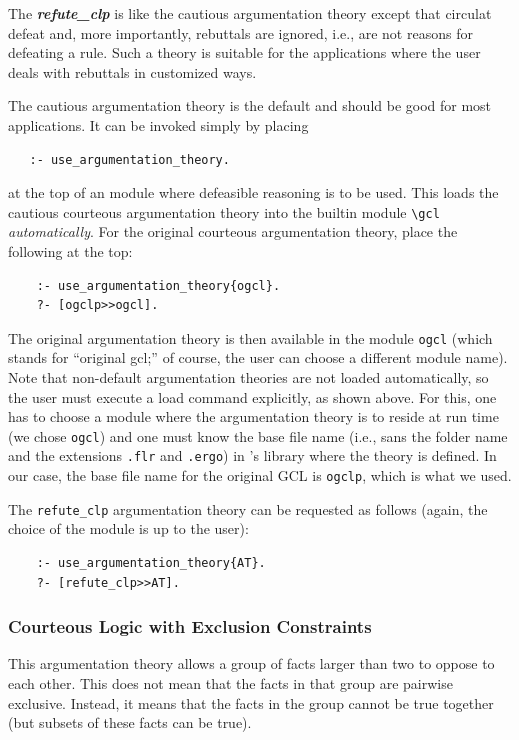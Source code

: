 \documentclass[11pt]{article}
\newcommand{\ERGO}{\mbox{\smaller{\ensuremath{\cal{E}}\smaller{{\sc{RGO}}}}}\xspace}
\newcommand{\FLSYSTEM}{\ERGO}
\newcommand{\bs}{\textbackslash}
\begin{document}
The \textbf{\emph{refute\_clp}}  is like the cautious argumentation
theory except that circulat defeat and, more importantly,
rebuttals are ignored, i.e., are not reasons for defeating a rule.
Such a theory is suitable for the applications where the user deals with
rebuttals in customized ways.

The cautious argumentation theory is the default and should be good for most
  applications. It can be invoked simply by placing
\begin{verbatim}
   :- use_argumentation_theory.
\end{verbatim}
  at the top of an \FLSYSTEM module where defeasible reasoning is to be
  used.  This loads the cautious courteous argumentation theory into the builtin
  module {\tt \bs{}gcl} \emph{automatically}. For the original courteous argumentation theory,
  place the following at the top:
\begin{verbatim}
    :- use_argumentation_theory{ogcl}.
    ?- [ogclp>>ogcl].
\end{verbatim}
The original argumentation theory is then available in the module {\tt ogcl}
(which stands for ``original gcl;'' of course, the user can choose a different module name).
Note that non-default argumentation theories are not loaded
automatically, so the user must execute a load command explicitly, as shown
above. For this, one has to choose a module where the
argumentation theory is to reside at run time
(we chose \texttt{ogcl}) and one must know the base file
name (i.e., sans the folder name and the extensions \texttt{.flr} and
\texttt{.ergo}) in \FLSYSTEM's library where the theory is defined. In our case, the base file name
for the original GCL is \texttt{ogclp}, which is what we used. 

The \texttt{refute\_clp} argumentation theory can be requested as follows (again,
the choice of the module is up to the user):
\begin{verbatim}
    :- use_argumentation_theory{AT}.
    ?- [refute_clp>>AT].
\end{verbatim}

\subsubsection{Courteous Logic with Exclusion Constraints}

This argumentation theory
allows a group of facts larger than two to oppose to each other. This does
not mean that the facts in that group are pairwise exclusive. Instead, it
means that the facts in the group cannot be true together (but subsets of
these facts can be true).
\end{document}
